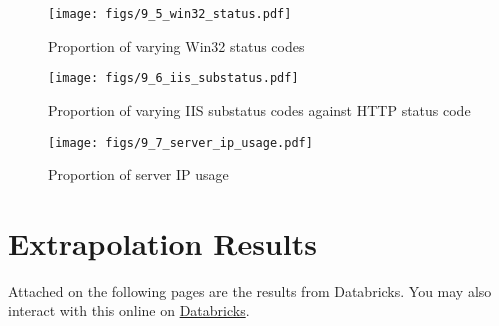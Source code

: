\documentclass[12pt,titlepage]{article}
\begin{document}
\begin{figure}[thbp]
  \centering
  \texttt{[image: figs/9\_5\_win32\_status.pdf]}
  \caption{Proportion of varying Win32 status codes}
  \label{fig:9_5_win32_status}
\end{figure}

\begin{figure}[thbp]
  \centering
  \texttt{[image: figs/9\_6\_iis\_substatus.pdf]}
  \caption{Proportion of varying IIS substatus codes against HTTP status code}
  \label{fig:9_6_iis_substatus}
\end{figure}

\begin{figure}[thbp]
  \centering
  \texttt{[image: figs/9\_7\_server\_ip\_usage.pdf]}
  \caption{Proportion of server IP usage}
  \label{fig:9_7_server_ip_usage}
\end{figure}

\clearpage

\section{Extrapolation Results}
\label{apx:results}

Attached on the following pages are the results from Databricks. You may also interact with this online on \href{https://databricks-prod-cloudfront.cloud.databricks.com/public/4027ec902e239c93eaaa8714f173bcfc/7364378259770565/3552971541306612/8155742302574378/latest.html}{Databricks}.


\end{document}
